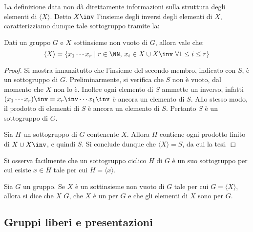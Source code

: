 \documentclass[11pt]{scrartcl}
\begin{document}
	La definizione data non dà direttamente informazioni sulla struttura degli elementi di 
	$\langle X \rangle$. Detto $X\inv$ l'insieme degli inversi degli elementi di $X$, caratterizziamo dunque tale sottogruppo tramite
	la:
	
	\begin{proposition}
		Dati un gruppo $G$ e $X$ sottinsieme non vuoto di $G$, allora vale che:
		\[
		\langle X \rangle = \{x_1 \cdots x_r \mid r 
		\in \NN, \, x_i \in X \cup X\inv ~\forall 1 \leq i \leq r\}
		\]
	\end{proposition}
	
	\begin{proof}
		Si mostra innanzitutto che l'insieme del secondo membro, indicato con $S$, è
		un sottogruppo di $G$. Preliminarmente, si verifica che $S$ non è vuoto,
		dal momento che $X$ non lo è. Inoltre ogni elemento di $S$ ammette un
		inverso, infatti $(x_1 \cdots x_r)\inv = x_r\inv \cdots x_1\inv$ è ancora
		un elemento di $S$. Allo stesso modo, il prodotto di elementi di
		$S$ è ancora un elemento di $S$. Pertanto $S$ è un sottogruppo di $G$. \medskip
		
		
		Sia $H$ un sottogruppo di $G$ contenente $X$. Allora $H$ contiene ogni prodotto
		finito di $X \cup X\inv$, e quindi $S$. Si conclude dunque che $\langle X \rangle = S$, da cui la tesi.
	\end{proof}
	
	\begin{remark}
		Si osserva facilmente che un sottogruppo ciclico $H$ di $G$ è un suo sottogruppo per cui esiste $x \in H$ tale per cui $H = \langle x \rangle$.
	\end{remark}
	
	\begin{definition}
		Sia $G$ un gruppo. Se $X$ è un sottinsieme non vuoto di $G$ tale per
		cui $G = \langle X \rangle$, allora si dice che $X$  $G$,
		che $X$ è un  per $G$ e che gli
		elementi di $X$ sono  per $G$.
	\end{definition}
	
	\newpage
	\subsection{Gruppi liberi e presentazioni}
	
\end{document}
